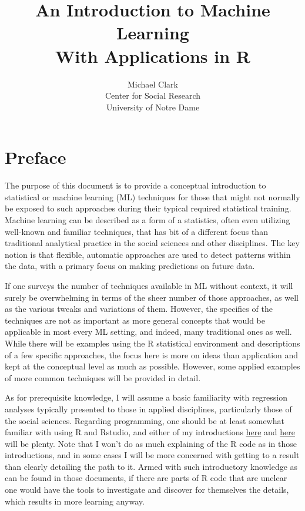 \documentclass[english,nohyper,titlepage]{tufte-handout}\usepackage{knitr}
\title{\LARGE An Introduction to Machine Learning \\ 
\noindent \normalsize With Applications in R\normalsize}
\author{{\small Michael Clark\\
         \noindent Center for Social Research\\
         \noindent University of Notre Dame\\}}
\begin{document}


\maketitle
\pagebreak{}
\tableofcontents{}
\pagebreak{}



\part{Preface}

The purpose of this document is to provide a conceptual introduction to statistical or machine learning (ML) techniques for those that might not normally be exposed to such approaches during their typical required statistical training.  Machine learning can be described as a form of a statistics, often even utilizing well-known and familiar techniques, that has bit of a different focus than traditional analytical practice in the social sciences and other disciplines.  The key notion is that flexible, automatic approaches are used to detect patterns within the data, with a primary focus on making predictions on future data.

If one surveys the number of techniques available in ML without context, it will surely be overwhelming in terms of the sheer number of those approaches, as well as the various tweaks and variations of them.  However, the specifics of the techniques are not as important as more general concepts that would be applicable in most every ML setting, and indeed, many traditional ones as well.  While there will be examples using the R statistical environment and descriptions of a few specific approaches, the focus here is more on ideas than application and kept at the conceptual level as much as possible.  However, some applied examples of more common techniques will be provided in detail.

As for prerequisite knowledge, I will assume a basic familiarity with regression analyses typically presented to those in applied disciplines, particularly those of the social sciences.  Regarding programming, one should be at least somewhat familiar with using R and Rstudio, and either of my introductions \href{http://www.nd.edu/~mclark19/learn/Introduction_to_R.pdf}{here} and \href{http://www.nd.edu/~mclark19/learn/Introduction_to_R_II.pdf}{here} will be plenty.  Note that I won't do as much explaining of the R code as in those introductions, and in some cases I will be more concerned with getting to a result than clearly detailing the path to it.  Armed with such introductory knowledge as can be found in those documents, if there are parts of R code that are unclear one would have the tools to investigate and discover for themselves the details, which results in more learning anyway.
\end{document}
